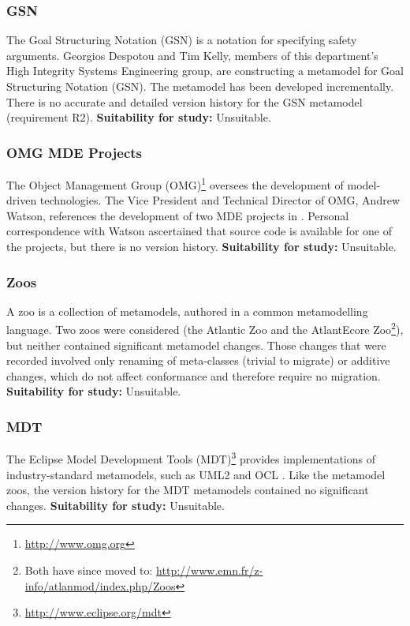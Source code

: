 \subsubsection{GSN}
\label{par:gsn}
The Goal Structuring Notation (GSN) \cite{kelly99thesis} is a notation for specifying safety arguments. Georgios Despotou and Tim Kelly, members of this department's High Integrity Systems Engineering group, are constructing a metamodel for Goal Structuring Notation (GSN). The metamodel has been developed incrementally. There is no accurate and detailed version history for the GSN metamodel (requirement R2). \textbf{Suitability for study:} Unsuitable.

\subsubsection{OMG MDE Projects}
\label{par:omg}
The Object Management Group (OMG)\footnote{\url{http://www.omg.org}} oversees the development of model-driven technologies. The Vice President and Technical Director of OMG, Andrew Watson, references the development of two MDE projects in \cite{watson08mdahistory}. Personal correspondence with Watson ascertained that source code is available for one of the projects, but there is no version history. \textbf{Suitability for study:} Unsuitable.

\subsubsection{Zoos}
\label{par:zoos}
A zoo is a collection of metamodels, authored in a common metamodelling language. Two zoos were considered (the Atlantic Zoo and the AtlantEcore Zoo\footnote{Both have since moved to: \url{http://www.emn.fr/z-info/atlanmod/index.php/Zoos}}), but neither contained significant metamodel changes. Those changes that were recorded involved only renaming of meta-classes (trivial to migrate) or additive changes, which do not affect conformance and therefore require no migration. \textbf{Suitability for study:} Unsuitable.

\subsubsection{MDT}
The Eclipse Model Development Tools (MDT)\footnote{\url{http://www.eclipse.org/mdt}} provides implementations of industry-standard metamodels, such as UML2 \cite{uml212} and OCL \cite{ocl2}. Like the metamodel zoos, the version history for the MDT metamodels contained no significant changes. \textbf{Suitability for study:} Unsuitable.

